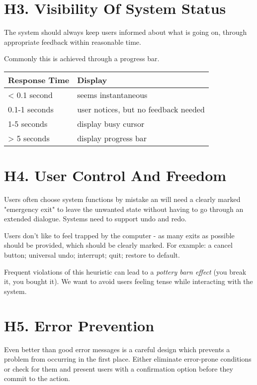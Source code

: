 \section{H3. Visibility Of System Status}
The system should always keep users informed about what is going on, through appropriate feedback within reasonable time. 

Commonly this is achieved through a progress bar.

\begin{table}[H]
    \centering
    \begin{tabular}{p{} p{}}
        \textbf{Response Time} & \textbf{Display}\\
        \hline
        \hline
        < 0.1 second & seems instantaneous\\
        \hline
        0.1-1 seconds & user notices, but no feedback needed\\
        \hline
        1-5 seconds & display busy cursor\\
        \hline
        > 5 seconds & display progress bar\\
        \hline        
    \end{tabular}
\end{table}

\section{H4. User Control And Freedom}
Users often choose system functions by mistake an will need a clearly marked "emergency exit" to leave the unwanted state without having to go through an extended dialogue. Systems need to support undo and redo.

Users don't like to feel trapped by the computer - as many exits as possible should be provided, which should be clearly marked. For example: a cancel button; universal undo; interrupt; quit; restore to default. 

Frequent violations of this heuristic can lead to a \textit{pottery barn effect} (you break it, you bought it). We want to avoid users feeling tense while interacting with the system.

\section{H5. Error Prevention}
Even better than good error messages is a careful design which prevents a problem from occurring in the first place. Either eliminate error-prone conditions or check for them and present users with a confirmation option before they commit to the action. 

